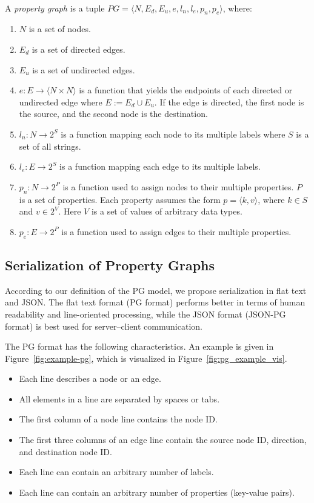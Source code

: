 \documentclass[runningheads]{llncs}
\begin{document}
\begin{defi}
\leavevmode \vspace{1mm} \\
A \emph{property graph} is a tuple
$PG = \langle N, E_d, E_u, e, l_n, l_e, p_n, p_e\rangle$, where:
\begin{enumerate}
    \item $N$ is a set of nodes.
    \item $E_d$ is a set of directed edges.
    \item $E_u$ is a set of undirected edges.
    \item $e: E \to \langle N \times N \rangle$ is a function that yields the endpoints of each directed or undirected edge where $E := E_d \cup E_u$. If the edge is directed, the first node is the source, and the second node is the destination.
    \item $l_n : N \to 2^S$ is a function mapping each node to its multiple labels where $S$ is a set of all strings.
    \item $l_e : E \to 2^S$ is a function mapping each edge to its multiple labels.
    \item $p_n : N \to 2^P$ is a function used to assign nodes to their multiple properties. $P$ is a set of properties. Each property assumes the form $p = \langle k,v \rangle$, where $k \in S$ and $v \in 2^V$. Here $V$ is a set of values of arbitrary data types.
    \item $p_e : E \to 2^P$ is a function used to assign edges to their multiple properties.
\end{enumerate}
\end{defi}


\subsection{Serialization of Property Graphs}
According to our definition of the PG model, we propose serialization in flat text and JSON. The flat text format (PG format) performs better in terms of human readability and line-oriented processing, while the JSON format (JSON-PG format) is best used for server--client communication.

The PG format has the following characteristics. An example is given in Figure~\ref{fig:example-pg}, which is visualized in Figure~\ref{fig:pg_example_vis}.

\begin{itemize}
    \item Each line describes a node or an edge.
    \item All elements in a line are separated by spaces or tabs.
    \item The first column of a node line contains the node ID.
    \item The first three columns of an edge line contain the source node ID, direction, and destination node ID.
    \item Each line can contain an arbitrary number of labels.
    \item Each line can contain an arbitrary number of properties (key-value pairs).
\end{itemize}
\end{document}

